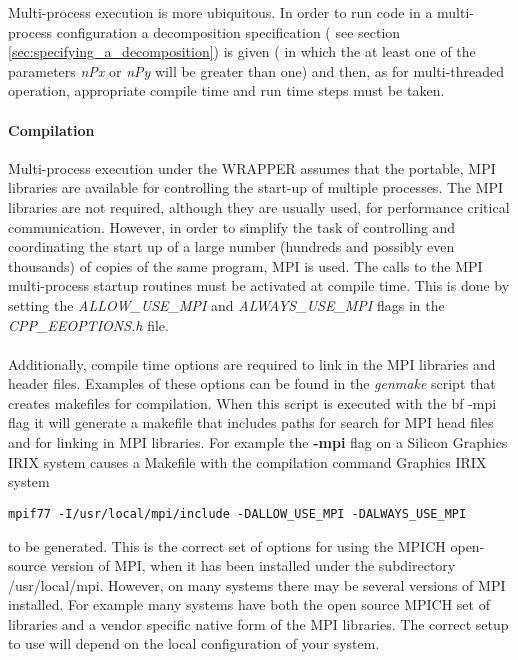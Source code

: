 Multi-process execution is more ubiquitous.
In order to run code in a multi-process configuration a decomposition
specification ( see section \ref{sec:specifying_a_decomposition})
is given ( in which the at least one of the
parameters {\em nPx} or {\em nPy} will be greater than one)
and then, as for multi-threaded operation,
appropriate compile time and run time steps must be taken.

\paragraph{Compilation} Multi-process execution under the WRAPPER 
assumes that the portable, MPI libraries are available
for controlling the start-up of multiple processes. The MPI libraries
are not required, although they are usually used, for performance
critical communication. However, in order to simplify the task
of controlling and coordinating the start up of a large number
(hundreds and possibly even thousands) of copies of the same 
program, MPI is used. The calls to the MPI multi-process startup
routines must be activated at compile time. This is done
by setting the {\em ALLOW\_USE\_MPI} and {\em ALWAYS\_USE\_MPI}
flags in the {\em CPP\_EEOPTIONS.h} file.\\

 \\

Additionally, compile time options are required to link in the 
MPI libraries and header files. Examples of these options 
can be found in the {\em genmake} script that creates makefiles
for compilation. When this script is executed with the {bf -mpi}
flag it will generate a makefile that includes
paths for search for MPI head files and for linking in 
MPI libraries. For example the {\bf -mpi} flag on a
 Silicon Graphics IRIX system causes a
Makefile with the compilation command
Graphics IRIX system \begin{verbatim}
mpif77 -I/usr/local/mpi/include -DALLOW_USE_MPI -DALWAYS_USE_MPI
\end{verbatim}
to be generated.
This is the correct set of options for using the MPICH open-source
version of MPI, when it has been installed under the subdirectory
/usr/local/mpi.
However, on many systems there may be several
versions of MPI installed. For example many systems have both
the open source MPICH set of libraries and a vendor specific native form
of the MPI libraries. The correct setup to use will depend on the
local configuration of your system.\\

